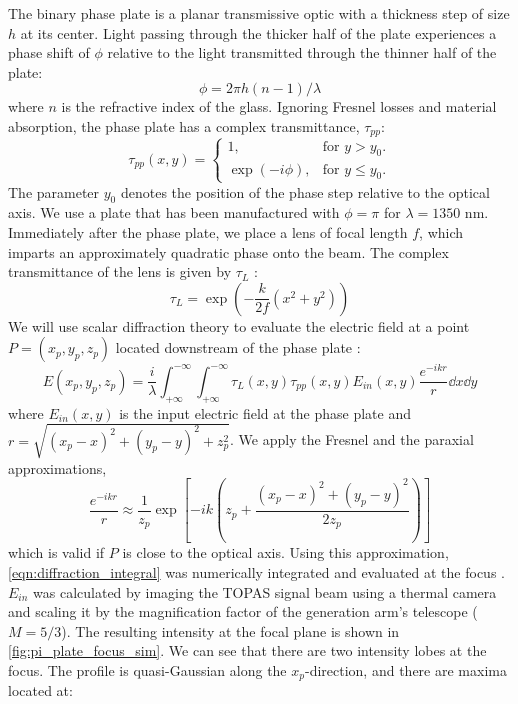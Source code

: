 The binary phase plate is a planar transmissive optic with a thickness step of size $h$ at its center. Light passing through the thicker half of the plate experiences a phase shift of $\phi$ relative to the light transmitted through the thinner half of the plate:
\begin{equation}
\phi = 2 \pi h (n-1)/\lambda
\end{equation}
where $n$ is the refractive index of the glass. Ignoring Fresnel losses and material absorption, the phase plate has a complex transmittance, $\tau_{pp}$:
\begin{equation}
\tau_{pp} (x, y) =  \begin{cases}
1, & \textrm{for $y > y_0$}.\\
\exp (-i \phi), & \textrm{for $y \le y_0$}.
\end{cases}
\label{eqn:phase-plate-transmission}
\end{equation}
The parameter $y_0$ denotes the position of the phase step relative to the optical axis. We use a plate that has been manufactured with $\phi=\pi$ for $\lambda = 1350 \textrm{ nm}$. Immediately after the phase plate, we place a lens of focal length $f$, which imparts an approximately quadratic phase onto the beam. The complex transmittance of the lens is given by $\tau_L$ \cite{goodmanIntroductionFourierOptics1996}:
\begin{equation}
\tau_L = \exp \left( - \frac{k}{2 f} (x^2 + y^2) \right)
\end{equation}
We will use scalar diffraction theory to evaluate the electric field at a point $P=(x_p, y_p, z_p)$ located downstream of the phase plate \cite{passillySimpleInterferometricTechnique2005}:
\begin{equation}
E(x_p, y_p, z_p) = \frac{i}{\lambda} \int_{+ \infty}^{- \infty} \int_{+ \infty}^{- \infty} \tau_{L} (x,y) \tau_{pp} (x,y) E_{in} (x,y) \frac{e^{-i k r}}{r} \dd{x} \dd{y}
\label{eqn:diffraction_integral}
\end{equation}
where $E_{in}(x,y)$ is the input electric field at the phase plate and $r = \sqrt{(x_p-x)^2 + (y_p-y)^2 + z_p^2}$. We apply the Fresnel and the paraxial approximations,
\begin{equation}
\frac{e^{-i k r}}{r} \approx \frac{1}{z_p} \exp \left[-ik \left(z_p + \frac{(x_p-x)^2 + (y_p-y)^2}{2z_p} \right) \right]
\label{eqn:fresnel_paraxial_approx}
\end{equation}
which is valid if $P$ is close to the optical axis. Using this approximation, \cref{eqn:diffraction_integral} was numerically integrated and evaluated at the focus \cite{vdovinLightPipesPython}. $E_{in}$ was calculated by imaging the TOPAS signal beam using a thermal camera and scaling it by the magnification factor of the generation arm's telescope (${M=5/3}$). The resulting intensity at the focal plane is shown in \cref{fig:pi_plate_focus_sim}. We can see that there are two intensity lobes at the focus. The profile is quasi-Gaussian along the $x_p$-direction, and there are maxima located at:
